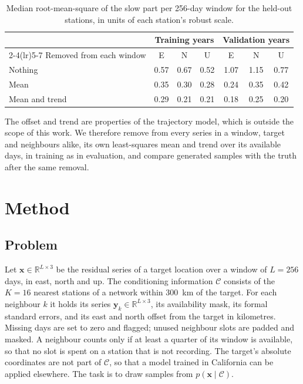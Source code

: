\documentclass[preprint,12pt,authoryear]{elsarticle}
\begin{document}
\begin{table}[t]
  \centering
  \caption{Median root-mean-square of the slow part per 256-day window for the held-out
  stations, in units of each station's robust scale.}
  \label{tab:drift}
  \small
  \begin{tabular}{lcccccc}
    \toprule
    & \multicolumn{3}{c}{Training years} & \multicolumn{3}{c}{Validation years} \\
    \cmidrule(lr){2-4}\cmidrule(lr){5-7}
    Removed from each window & E & N & U & E & N & U \\
    \midrule
    Nothing & 0.57 & 0.67 & 0.52 & 1.07 & 1.15 & 0.77 \\
    Mean & 0.35 & 0.30 & 0.28 & 0.24 & 0.35 & 0.42 \\
    Mean and trend & 0.29 & 0.21 & 0.21 & 0.18 & 0.25 & 0.20 \\
    \bottomrule
  \end{tabular}
\end{table}

The offset and trend are properties of the trajectory model, which is outside the scope
of this work. We therefore remove from every series in a window, target and neighbours
alike, its own least-squares mean and trend over its available days, in training as in
evaluation, and compare generated samples with the truth after the same removal.

\section{Method}
\label{sec:method}

\subsection{Problem}

Let $\mathbf{x} \in \mathbb{R}^{L \times 3}$ be the residual series of a target location
over a window of $L = 256$ days, in east, north and up. The conditioning information
$\mathcal{C}$ consists of the $K = 16$ nearest stations of a network within 300~km of the
target. For each neighbour $k$ it holds its series $\mathbf{y}_k \in \mathbb{R}^{L \times
3}$, its availability mask, its formal standard errors, and its east and north offset
from the target in kilometres. Missing days are set to zero and flagged; unused neighbour
slots are padded and masked. A neighbour counts only if at least a quarter of its window
is available, so that no slot is spent on a station that is not recording. The target's
absolute coordinates are not part of $\mathcal{C}$, so that a model trained in California
can be applied elsewhere. The task is to draw samples from $p(\mathbf{x} \mid \mathcal{C})$.
\end{document}
